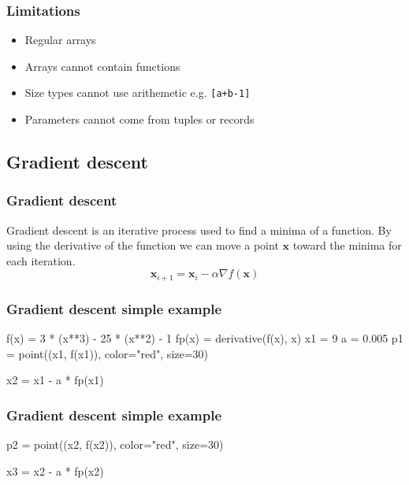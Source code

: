 \documentclass{beamer}
\begin{document}
\begin{frame}
    \frametitle{Limitations}
    \begin{itemize}
        \item Regular arrays
        \item Arrays cannot contain functions
        \item Size types cannot use arithemetic e.g. \texttt{[a+b-1]}
        \item Parameters cannot come from tuples or records
    \end{itemize}
\end{frame}

\subsection{Gradient descent}

\begin{frame}
    \frametitle{Gradient descent}
    Gradient descent is an iterative process used to find a minima of a function.
    \pause
    By using the derivative of the function we can move a point $\bm{x}$ toward the minima for each iteration.
    $$\bm{x}_{i+1} = \bm{x}_i - \alpha \nabla f(\bm{x})$$
\end{frame}

\begin{frame}[fragile]
    \frametitle{Gradient descent simple example}
    \begin{sageblock}
f(x) = 3 * (x**3) - 25 * (x**2) - 1
fp(x) = derivative(f(x), x)
x1 = 9
a = 0.005
p1 = point((x1, f(x1)), color="red", size=30)
    \end{sageblock}
    \begin{figure}
        \centering
    \end{figure}
    \begin{sageblock}
x2 = x1 - a * fp(x1)
    \end{sageblock}

\end{frame}

\begin{frame}[fragile]
    \frametitle{Gradient descent simple example}
    \begin{sageblock}
p2 = point((x2, f(x2)), color="red", size=30)
    \end{sageblock}
    \begin{figure}
        \centering
    \end{figure}
    \begin{sageblock}
x3 = x2 - a * fp(x2)
    \end{sageblock}
\end{frame}
\end{document}

